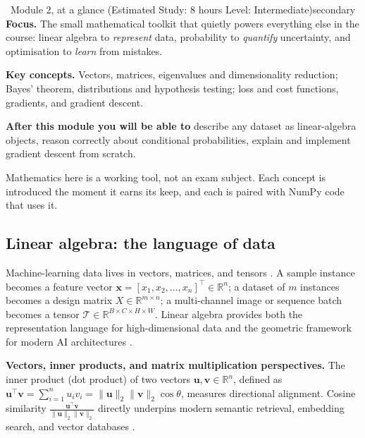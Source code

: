 \documentclass[11pt,a4paper]{article}
\begin{document}
	\begin{modulecard}{\faRulerCombined\ Module 2, at a glance \hfill \small\normalfont (Estimated Study: 8 hours \textbullet{} Level: Intermediate)}{secondary}
		\textbf{Focus.} The small mathematical toolkit that quietly powers
		everything else in the course: linear algebra to \emph{represent} data,
		probability to \emph{quantify} uncertainty, and optimisation to
		\emph{learn} from mistakes.
		
		\medskip
		\textbf{Key concepts.} Vectors, matrices, eigenvalues and dimensionality
		reduction; Bayes' theorem, distributions and hypothesis testing; loss
		and cost functions, gradients, and gradient descent.
		
		\medskip
		\textbf{After this module you will be able to} describe any dataset as
		linear-algebra objects, reason correctly about conditional
		probabilities, explain and implement gradient descent from
		scratch.
	\end{modulecard}
	
	Mathematics here is a working tool, not an exam subject. Each concept is
	introduced the moment it earns its keep, and each is paired with NumPy
	code that uses it.
	
	\subsection{Linear algebra: the language of data}

	Machine-learning data lives in vectors, matrices, and tensors \parencite{strang2012linear, strang2019, deisenroth2020}. A sample instance becomes a feature vector
	$\mathbf{x} = [x_1, x_2, \dots, x_n]^\top \in \mathbb{R}^n$; a dataset of $m$ instances becomes a design matrix $X \in \mathbb{R}^{m \times n}$; a multi-channel image or sequence batch becomes a tensor $\mathcal{T} \in \mathbb{R}^{B \times C \times H \times W}$. Linear algebra provides both the representation language for high-dimensional data and the geometric framework for modern AI architectures \parencite{goodfellow2016}.

	\textbf{Vectors, inner products, and matrix multiplication perspectives.}
	The inner product (dot product) of two vectors $\mathbf{u}, \mathbf{v} \in \mathbb{R}^n$, defined as $\mathbf{u}^\top \mathbf{v} = \sum_{i=1}^n u_i v_i = \|\mathbf{u}\|_2 \|\mathbf{v}\|_2 \cos \theta$, measures directional alignment. Cosine similarity $\frac{\mathbf{u}^\top \mathbf{v}}{\|\mathbf{u}\|_2 \|\mathbf{v}\|_2}$ directly underpins modern semantic retrieval, embedding search, and vector databases \parencite{strang2019}.
\end{document}

